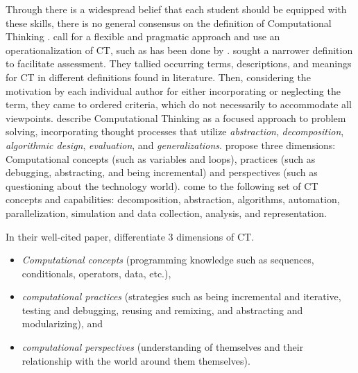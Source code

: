 Through there is a widespread belief that each student should be equipped with these skills, there is no general consensus on the definition of Computational Thinking \cite{Yadav2015}.  call for a flexible and pragmatic approach and use an operationalization of CT, such as has been done by .  sought a narrower definition to facilitate assessment. They tallied occurring terms, descriptions, and meanings for CT in different definitions found in literature. Then, considering the motivation by each individual author for either incorporating or neglecting the term, they came to ordered criteria, which do not necessarily to accommodate all viewpoints.  describe Computational Thinking as a focused approach to problem solving, incorporating thought processes that utilize \emph{abstraction}, \emph{decomposition}, \emph{algorithmic design}, \emph{evaluation}, and \emph{generalizations}.  propose three dimensions: Computational concepts (such as variables and loops), practices (such as debugging, abstracting, and being incremental) and perspectives (such as  questioning about the technology world).  come to the following set of CT concepts and capabilities: decomposition, abstraction, algorithms, automation, parallelization, simulation and data collection, analysis, and representation.
%

In their well-cited paper,   differentiate 3 dimensions of CT.
\begin{itemize}
\item \emph{Computational concepts} (programming knowledge such as sequences, conditionals, operators, data, etc.),
\item \emph{computational practices} (strategies such as being incremental and
iterative, testing and debugging, reusing and remixing, and abstracting and modularizing), and
\item \emph{computational perspectives} (understanding of themselves and their relationship with the world around them themselves).
\end{itemize}


